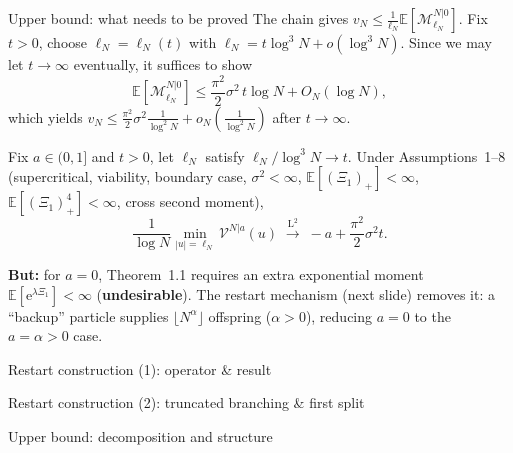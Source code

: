 \documentclass[10pt, aspectratio=169]{beamer}
\newcommand{\E}{\mathbb{E}}
\newcommand{\e}{\mathrm{e}}
\begin{document}
\begin{frame}{Upper bound: what needs to be proved}
    \small
    The chain gives $v_N\le\frac{1}{\ell_N}\E[\mathcal M_{\ell_N}^{N|0}]$.
    Fix $t>0$, choose $\ell_N=\ell_N(t)$ with $\ell_N=t\log^3 N+o(\log^3 N)$.
    Since we may let $t\to\infty$ eventually, it suffices to show
    \[
        \E[\mathcal M_{\ell_N}^{N|0}]
        \le
        \frac{\pi^2}{2}\sigma^2\,t\log N
        +
        O_N(\log N),
    \]
    which yields $v_N\le\frac{\pi^2}{2}\sigma^2\frac{1}{\log^2 N}+o_N\!\left(\frac{1}{\log^2 N}\right)$ after $t\to\infty$.

    \medskip
    \begin{theorem}[{Theorem~1.1, $\mathrm{L}^2$ edition, $a\in(0,1]$}]
        Fix $a\in(0,1]$ and $t>0$, let $\ell_N$ satisfy $\ell_N/\log^3 N\to t$. Under Assumptions~1--8 (supercritical, viability, boundary case, $\sigma^2<\infty$, $\E[(\Xi_1)_+]<\infty$, $\E[(\Xi_1)_+^4]<\infty$, cross second moment),
        \[
            \frac{1}{\log N}\min_{|u|=\ell_N}\mathcal V^{N|a}(u)
            \;\xrightarrow{\mathrm{L}^2}\;
            -a+\frac{\pi^2}{2}\sigma^2 t.
        \]
    \end{theorem}

    \textbf{But:} for $a=0$, Theorem~1.1 requires an extra exponential moment $\E[\e^{\lambda\Xi_1}]<\infty$ (\textbf{undesirable}).
    The restart mechanism (next slide) removes it: a ``backup'' particle supplies $\lfloor N^\alpha\rfloor$ offspring ($\alpha>0$), reducing $a=0$ to the $a=\alpha>0$ case.
\end{frame}

\begin{frame}{Restart construction (1): operator \& result}
    \small
    
\end{frame}

\begin{frame}{Restart construction (2): truncated branching \& first split}
    \small
    
\end{frame}

\begin{frame}{Upper bound: decomposition and structure}
    
\end{frame}
\end{document}
